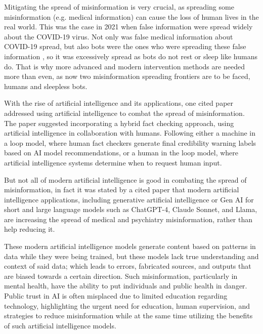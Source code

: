 \documentclass[twocolumn, a4paper, 12pt]{article}
\begin{document}
Mitigating the spread of misinformation is very crucial, as spreading some misinformation (e.g. medical information) can cause the loss of human lives in the real world. This was the case in 2021 when false information were spread widely about the COVID-19 virus. Not only was false medical information about COVID-19 spread, but also bots were the ones who were spreading these false information \cite{covid}, so it was excessively spread as bots do not rest or sleep like humans do. That is why more advanced and modern intervention methods are needed more than even, as now two misinformation spreading frontiers are to be faced, humans and sleepless bots.

With the rise of artificial intelligence and its applications, one cited paper addressed using artificial intelligence to combat the spread of misinformation. The paper suggested incorporating a hybrid fact checking approach, using artificial intelligence in collaboration with humans. Following either a machine in a loop model, where human fact checkers generate final credibility warning labels based on AI model recommendations, or a human in the loop model, where artificial intelligence systems determine when to request human input. \cite{ai_detection}

But not all of modern artificial intelligence is good in combating the spread of misinformation, in fact it was stated by a cited paper that modern artificial intelligence applications, including generative artificial intelligence or Gen AI for short and large language models such as ChatGPT-4, Claude Sonnet, and Llama, are increasing the spread of medical and psychiatry misinformation, rather than help reducing it. \cite{ai_increasing_misinformation}

These modern artificial intelligence models generate content based on patterns in data while they were being trained, but these models lack true understanding and context of said data; which leads to errors, fabricated sources, and outputs that are biased towards a certain direction. Such misinformation, particularly in mental health, have the ability to put individuals and public health in danger. Public trust in AI is often misplaced due to limited education regarding technology, highlighting the urgent need for education, human supervision, and strategies to reduce misinformation while at the same time utilizing the benefits of such artificial intelligence models. \cite{ai_increasing_misinformation}
\end{document}
